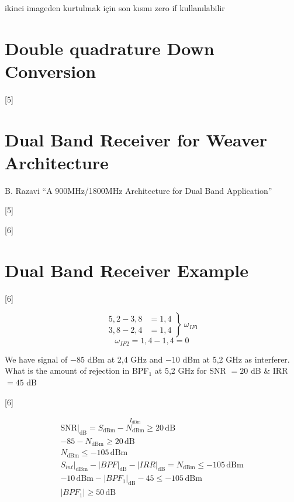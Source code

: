 \documentclass[11pt,a4paper]{article}
\begin{document}
ikinci imageden kurtulmak için son kısmı zero if kullanılabilir

\section{Double quadrature Down Conversion}

[5]

\section{Dual Band Receiver for Weaver Architecture}

B. Razavi ``A 900MHz/1800MHz Architecture for Dual Band Application''

[5]

[6]

\section{Dual Band Receiver Example}

[6]

\[ \left.\begin{aligned} 5{,}2-3{,}8&=1{,}4\\ 3{,}8-2{,}4&=1{,}4 \end{aligned}\right\}\ \omega_{IF1} \]
\[ \omega_{IF2}=1{,}4-1{,}4=0 \]

\begin{ornek}[Soru]
We have signal of $-85$ dBm at 2,4 GHz and $-10$ dBm at 5,2 GHz as interferer.
What is the amount of rejection in BPF$_1$ at 5,2 GHz for SNR $=20$ dB \& IRR $=45$ dB
\end{ornek}

[6]

\begin{gather*}
\mathrm{SNR}\big|_{\mathrm{dB}}=S_{\mathrm{dBm}}-\overset{I_{\mathrm{dBm}}}{N_{\mathrm{dBm}}}\ge 20\,\mathrm{dB}\\
-85-N_{\mathrm{dBm}}\ge 20\,\mathrm{dB}\\
N_{\mathrm{dBm}}\le -105\,\mathrm{dBm}\\
S_{int}\big|_{\mathrm{dBm}}-|BPF|_{\mathrm{dB}}-|IRR|_{\mathrm{dB}}=N_{\mathrm{dBm}}\le -105\,\mathrm{dBm}\\
-10\,\mathrm{dBm}-|BPF_1|_{\mathrm{dB}}-45\le -105\,\mathrm{dBm}\\
|BPF_1|\ge 50\,\mathrm{dB}
\end{gather*}
\end{document}

